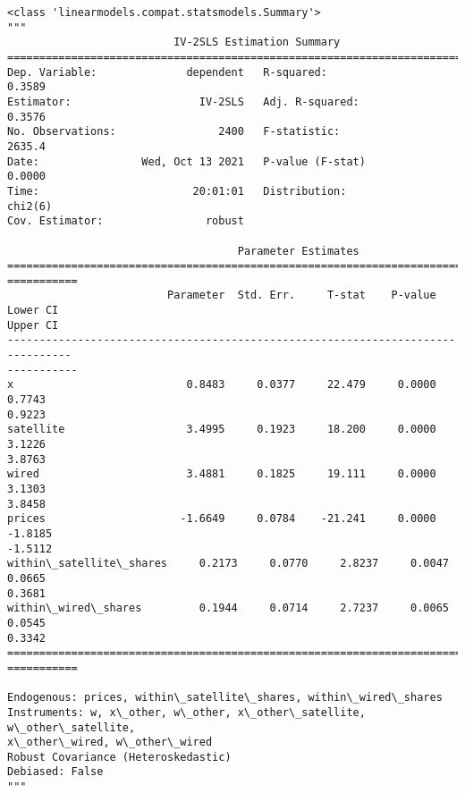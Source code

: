             \begin{tcolorbox}[breakable, size=fbox, boxrule=.5pt, pad at break*=1mm, opacityfill=0]
\begin{Verbatim}[commandchars=\\\{\}]
<class 'linearmodels.compat.statsmodels.Summary'>
"""
                          IV-2SLS Estimation Summary
==============================================================================
Dep. Variable:              dependent   R-squared:                      0.3589
Estimator:                    IV-2SLS   Adj. R-squared:                 0.3576
No. Observations:                2400   F-statistic:                    2635.4
Date:                Wed, Oct 13 2021   P-value (F-stat)                0.0000
Time:                        20:01:01   Distribution:                  chi2(6)
Cov. Estimator:                robust

                                    Parameter Estimates
================================================================================
===========
                         Parameter  Std. Err.     T-stat    P-value    Lower CI
Upper CI
--------------------------------------------------------------------------------
-----------
x                           0.8483     0.0377     22.479     0.0000      0.7743
0.9223
satellite                   3.4995     0.1923     18.200     0.0000      3.1226
3.8763
wired                       3.4881     0.1825     19.111     0.0000      3.1303
3.8458
prices                     -1.6649     0.0784    -21.241     0.0000     -1.8185
-1.5112
within\_satellite\_shares     0.2173     0.0770     2.8237     0.0047      0.0665
0.3681
within\_wired\_shares         0.1944     0.0714     2.7237     0.0065      0.0545
0.3342
================================================================================
===========

Endogenous: prices, within\_satellite\_shares, within\_wired\_shares
Instruments: w, x\_other, w\_other, x\_other\_satellite, w\_other\_satellite,
x\_other\_wired, w\_other\_wired
Robust Covariance (Heteroskedastic)
Debiased: False
"""
\end{Verbatim}
\end{tcolorbox}


